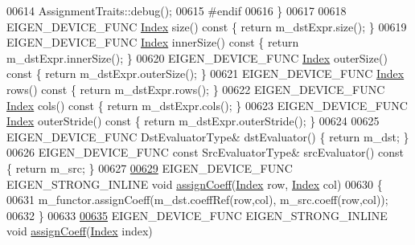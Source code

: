 \begin{DoxyCode}
00614     AssignmentTraits::debug();
00615 \textcolor{preprocessor}{    #endif}
00616   \}
00617   
00618   EIGEN\_DEVICE\_FUNC \hyperlink{namespace_eigen_a62e77e0933482dafde8fe197d9a2cfde}{Index} size()\textcolor{keyword}{ const        }\{ \textcolor{keywordflow}{return} m\_dstExpr.size(); \}
00619   EIGEN\_DEVICE\_FUNC \hyperlink{namespace_eigen_a62e77e0933482dafde8fe197d9a2cfde}{Index} innerSize()\textcolor{keyword}{ const   }\{ \textcolor{keywordflow}{return} m\_dstExpr.innerSize(); \}
00620   EIGEN\_DEVICE\_FUNC \hyperlink{namespace_eigen_a62e77e0933482dafde8fe197d9a2cfde}{Index} outerSize()\textcolor{keyword}{ const   }\{ \textcolor{keywordflow}{return} m\_dstExpr.outerSize(); \}
00621   EIGEN\_DEVICE\_FUNC \hyperlink{namespace_eigen_a62e77e0933482dafde8fe197d9a2cfde}{Index} rows()\textcolor{keyword}{ const        }\{ \textcolor{keywordflow}{return} m\_dstExpr.rows(); \}
00622   EIGEN\_DEVICE\_FUNC \hyperlink{namespace_eigen_a62e77e0933482dafde8fe197d9a2cfde}{Index} cols()\textcolor{keyword}{ const        }\{ \textcolor{keywordflow}{return} m\_dstExpr.cols(); \}
00623   EIGEN\_DEVICE\_FUNC \hyperlink{namespace_eigen_a62e77e0933482dafde8fe197d9a2cfde}{Index} outerStride()\textcolor{keyword}{ const }\{ \textcolor{keywordflow}{return} m\_dstExpr.outerStride(); \}
00624   
00625   EIGEN\_DEVICE\_FUNC DstEvaluatorType& dstEvaluator() \{ \textcolor{keywordflow}{return} m\_dst; \}
00626   EIGEN\_DEVICE\_FUNC \textcolor{keyword}{const} SrcEvaluatorType& srcEvaluator()\textcolor{keyword}{ const }\{ \textcolor{keywordflow}{return} m\_src; \}
00627   
\hyperlink{class_eigen_1_1internal_1_1generic__dense__assignment__kernel_a7ca974cc4049f1ef3d6f2feac94ea35b}{00629}   EIGEN\_DEVICE\_FUNC EIGEN\_STRONG\_INLINE \textcolor{keywordtype}{void} \hyperlink{class_eigen_1_1internal_1_1generic__dense__assignment__kernel_a7ca974cc4049f1ef3d6f2feac94ea35b}{assignCoeff}(\hyperlink{namespace_eigen_a62e77e0933482dafde8fe197d9a2cfde}{Index} row, 
      \hyperlink{namespace_eigen_a62e77e0933482dafde8fe197d9a2cfde}{Index} col)
00630   \{
00631     m\_functor.assignCoeff(m\_dst.coeffRef(row,col), m\_src.coeff(row,col));
00632   \}
00633   
\hyperlink{class_eigen_1_1internal_1_1generic__dense__assignment__kernel_a9f36120222600d1d843b4253b08a383b}{00635}   EIGEN\_DEVICE\_FUNC EIGEN\_STRONG\_INLINE \textcolor{keywordtype}{void} \hyperlink{class_eigen_1_1internal_1_1generic__dense__assignment__kernel_a9f36120222600d1d843b4253b08a383b}{assignCoeff}(\hyperlink{namespace_eigen_a62e77e0933482dafde8fe197d9a2cfde}{Index} index)

\end{DoxyCode}

